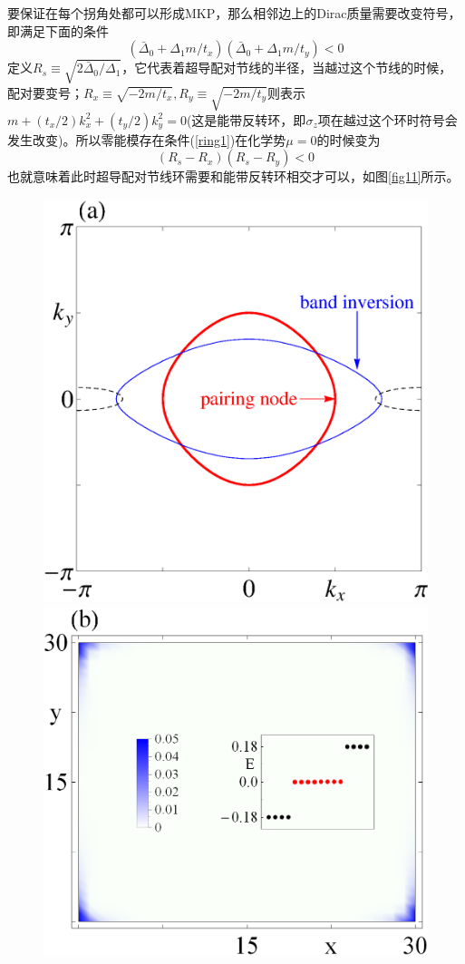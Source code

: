  要保证在每个拐角处都可以形成MKP，那么相邻边上的Dirac质量需要改变符号，即满足下面的条件
\begin{equation}
(\bar{\Delta}_0+\Delta_1m/t_x)(\bar{\Delta}_0+\Delta_1m/t_y)<0\label{ring1}
\end{equation}
定义$R_s\equiv\sqrt{2\bar{\Delta}_0/\Delta_1}$，它代表着超导配对节线的半径，当越过这个节线的时候，配对要变号；$R_x\equiv\sqrt{-2m/t_x},R_y\equiv\sqrt{-2m/t_y}$则表示$m+(t_x/2)k_x^2+(t_y/2)k_y^2=0$(这是能带反转环，即$\sigma_z$项在越过这个环时符号会发生改变)。所以零能模存在条件(\ref{ring1})在化学势$\mu=0$的时候变为
\begin{equation}
(R_s-R_x)(R_s-R_y)<0
\end{equation}
也就意味着此时超导配对节线环需要和能带反转环相交才可以，如图\ref{fig11}所示。
\begin{figure}[h]
\centering
\includegraphics[scale=0.45]{pic/fig12a}
\includegraphics[scale=0.45]{pic/fig12b}

\end{figure}
